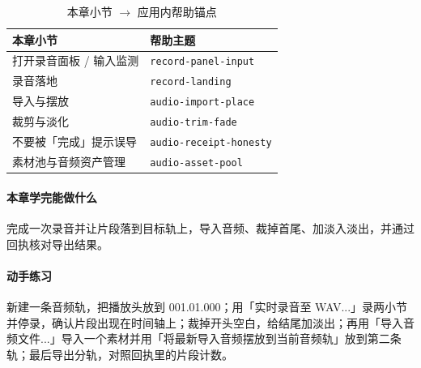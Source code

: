 \begin{table}[htbp]
\centering
\caption{本章小节 $\to$ 应用内帮助锚点}
\label{tab:ch05-help}
\begin{tabular}{ll}
\hline
本章小节 & 帮助主题 \\
\hline
打开录音面板 / 输入监测 & \texttt{record-panel-input} \\
录音落地 & \texttt{record-landing} \\
导入与摆放 & \texttt{audio-import-place} \\
裁剪与淡化 & \texttt{audio-trim-fade} \\
不要被「完成」提示误导 & \texttt{audio-receipt-honesty} \\
素材池与音频资产管理 & \texttt{audio-asset-pool} \\
\hline
\end{tabular}
\end{table}

\paragraph{本章学完能做什么} 完成一次录音并让片段落到目标轨上，导入音频、裁掉首尾、加淡入淡出，并通过回执核对导出结果。

\paragraph{动手练习} 新建一条音频轨，把播放头放到 001.01.000；用「实时录音至 WAV...」录两小节并停录，确认片段出现在时间轴上；裁掉开头空白，给结尾加淡出；再用「导入音频文件...」导入一个素材并用「将最新导入音频摆放到当前音频轨」放到第二条轨；最后导出分轨，对照回执里的片段计数。
